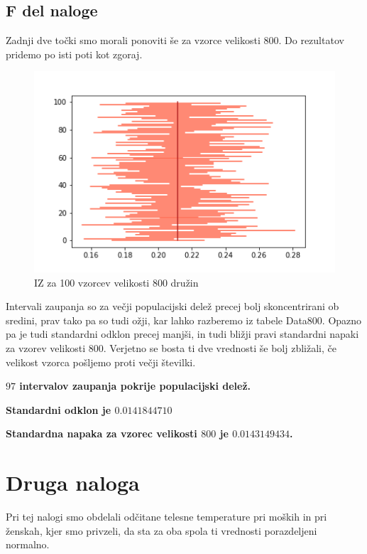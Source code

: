 \documentclass{article}
\begin{document}
    \subsection{F del naloge}
    Zadnji dve točki smo morali ponoviti še za vzorce velikosti 800. Do rezultatov pridemo po isti poti kot zgoraj.
    \begin{figure}[H]
        \begin{center}
            \includegraphics[scale=0.5]{../PythonKoda/IZ800.png}
            \caption{IZ za 100 vzorcev velikosti 800 družin}
            \label{800}
        \end{center} 
    \end{figure}
    Intervali zaupanja so za večji populacijski delež precej bolj skoncentrirani ob sredini, prav tako pa so tudi ožji, kar lahko razberemo iz tabele Data800. Opazno pa je
    tudi standardni odklon precej manjši, in tudi bližji pravi standardni napaki za vzorev velikosti 800. Verjetno se bosta ti dve vrednosti še bolj zbližali, če velikost vzorca
    pošljemo proti večji številki.
    \par \textbf{$97$ intervalov zaupanja pokrije populacijski delež.}
    \par \textbf{Standardni odklon je $0.0141844710$}
    \par \textbf{Standardna napaka za vzorec velikosti $800$ je $0.0143149434$.}


    \section{Druga naloga}
    Pri tej nalogi smo obdelali odčitane telesne temperature pri moških in pri ženskah, kjer smo privzeli, da sta za oba spola ti vrednosti porazdeljeni normalno.
\end{document}
